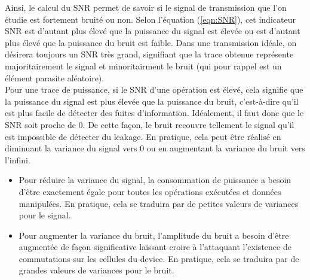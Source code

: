 \documentclass[10pt, oneside, a4paper]{article}
\begin{document}
\vspace{-0.2 cm}Ainsi, le calcul du SNR permet de savoir si le signal de transmission que l'on étudie est fortement bruité ou non. Selon l'équation (\ref{eqn:SNR}), cet indicateur SNR est d'autant plus élevé que la puissance du signal est élevée ou est d'autant plus élevé que la puissance du bruit est faible. Dans une transmission idéale, on désirera toujours un SNR très grand, signifiant que la trace obtenue représente majoritairement le signal et minoritairment le bruit (qui pour rappel est un élément parasite aléatoire). \\
Pour une trace de puissance, si le SNR d'une opération est élevé, cela signifie que la puissance du signal est plus élevée que la puissance du bruit, c'est-à-dire qu'il est plus facile de détecter des fuites d'information. Idéalement, il faut donc que le SNR soit proche de 0. De cette façon, le bruit recouvre tellement le signal qu'il est impossible de détecter du leakage. En pratique, cela peut être réalisé en diminuant la variance du signal vers 0 ou en augmentant la variance du bruit vers l'infini.
\begin{itemize}
\item Pour réduire la variance du signal, la consommation de puissance a besoin d'être exactement égale pour toutes les opérations exécutées et données manipulées. En pratique, cela se traduira par de petites valeurs de variances pour le signal.
\item Pour augmenter la variance du bruit, l'amplitude du bruit a besoin d'être augmentée de façon significative laissant croire à l'attaquant l'existence de commutations sur les cellules du device. En pratique, cela se traduira par de grandes valeurs de variances pour le bruit.
\end{itemize}

\newpage
\end{document}
